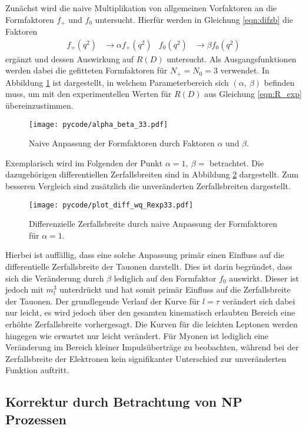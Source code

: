 Zunächst wird die naive Multiplikation von allgemeinen Vorfaktoren an die Formfaktoren $f_+$ und $f_0$ untersucht.
Hierfür werden in Gleichung \eqref{eqn:difzb} die Faktoren
\begin{align*}
  f_+(q^2) &\to \alpha f_+(q^2) & f_0(q^2) &\to \beta f_0(q^2)
\end{align*}
ergänzt und dessen Auswirkung auf $R(D)$ untersucht.
Als Ausgangsfunktionen werden dabei die gefitteten Formfaktoren für $N_+ = N_0 = \num{3}$ verwendet.
In Abbildung \ref{fig:alpha_beta} ist dargestellt, in welchem Parameterbereich sich $(\alpha, \: \beta)$ befinden muss, um mit den experimentellen Werten für $R(D)$ aus Gleichung \eqref{eqn:R_exp} übereinzustimmen.
\begin{figure}
  \centering
  \texttt{[image: pycode/alpha\_beta\_33.pdf]}
  \caption{Naive Anpassung der Formfaktoren durch Faktoren $\alpha$ und $\beta$.}
  \label{fig:alpha_beta}
\end{figure}

Exemplarisch wird im Folgenden der Punkt $\alpha = {1}, \: \beta = $ betrachtet.
Die dazugehörigen differentiellen Zerfallsbreiten sind in Abbildung \ref{fig:alpha_beta_wq} dargestellt.
Zum besseren Vergleich sind zusätzlich die unveränderten Zerfallsbreiten dargestellt.
\begin{figure}
  \centering
  \texttt{[image: pycode/plot\_diff\_wq\_Rexp33.pdf]}
  \caption{Differenzielle Zerfallsbreite durch naive Anpassung der Formfaktoren für $\alpha = \num{1}$.}
  \label{fig:alpha_beta_wq}
\end{figure}
Hierbei ist auffällig, dass eine solche Anpassung primär einen Einfluss auf die differentielle Zerfallsbreite der Tauonen darstellt.
Dies ist darin begründet, dass sich die Veränderung durch $\beta$ lediglich auf den Formfaktor $f_0$ auswirkt.
Dieser ist jedoch mit $m_l^3$ unterdrückt und hat somit primär Einfluss auf die Zerfallsbreite der Tauonen.
Der grundlegende Verlauf der Kurve für $l = \tau$ verändert sich dabei nur leicht, es wird jedoch über den gesamten kinematisch erlaubten Bereich eine erhöhte Zerfallsbreite vorhergesagt.
Die Kurven für die leichten Leptonen werden hingegen wie erwartet nur leicht verändert.
Für Myonen ist lediglich eine Veränderung im Bereich kleiner Impulsüberträge zu beobachten, während bei der Zerfallsbreite der Elektronen kein signifikanter Unterschied zur unveränderten Funktion auftritt.

\subsection{Korrektur durch Betrachtung von NP Prozessen}

